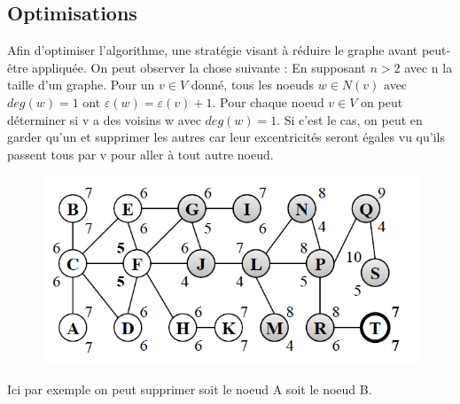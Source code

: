 \documentclass[11pt]{article}
\begin{document}
\subsection{Optimisations}
Afin d'optimiser l'algorithme, une stratégie visant à réduire le graphe avant
peut-être appliquée. On peut observer la chose suivante : \newline En supposant
$n > 2$ avec n la taille d'un graphe. Pour un $v \in V$ donné, tous les noeuds
$w \in N(v)$ avec $deg(w) = 1$ ont $\varepsilon(w) = \varepsilon(v) +
1$. \newline Pour chaque noeud $v \in V$ on peut déterminer si v a des voisins w
avec $deg(w) = 1$. Si c'est le cas, on peut en garder qu'un et supprimer les
autres car leur excentricités seront égales vu qu'ils passent tous par v pour
aller à tout autre noeud. \newline
\begin{figure}[h]
  \centering
  \includegraphics[scale=0.5]{image/graph.png}
\end{figure}
\newline Ici par exemple on peut supprimer soit le noeud A soit le noeud B.
\end{document}
